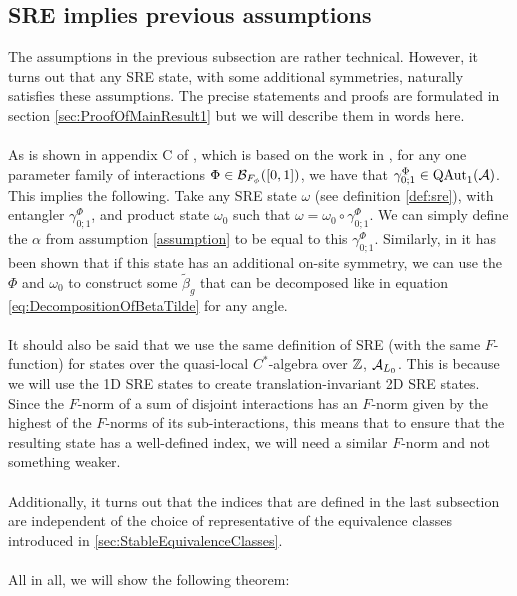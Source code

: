\documentclass[11pt,a4paper,twoside]{article}
\numberwithin{equation}{section}
\begin{document}
	\subsection{SRE implies previous assumptions}\label{sec:Results_1}
	The assumptions in the previous subsection are rather technical. However, it turns out that any SRE state, with some additional symmetries, naturally satisfies these assumptions. The precise statements and proofs are formulated in section \ref{sec:ProofOfMainResult1} but we will describe them in words here.
	\\\\
	As is shown in appendix C of \cite{jappens2023spt}, which is based on the work in \cite{ogata2021h3gmathbb}, for any one parameter family of interactions $\Phi\in\BB_{F_\phi}([0,1])$, we have that $\gamma^\Phi_{0;1}\in\QAut{\AA}$. This implies the following. Take any SRE state $\omega$ (see definition \ref{def:sre}), with entangler $\gamma^\Phi_{0;1}$, and product state $\omega_0$ such that $\omega=\omega_0\circ \gamma^\Phi_{0;1}$. We can simply define the $\alpha$ from assumption \ref{assumption} to be equal to this $\gamma^\Phi_{0;1}$. Similarly, in \cite{ogata2021h3gmathbb} it has been shown that if this state has an additional on-site symmetry, we can use the $\Phi$ and $\omega_0$ to construct some $\tilde\beta_g$ that can be decomposed like in equation \eqref{eq:DecompositionOfBetaTilde} for any angle.
	\\\\
	It should also be said that we use the same definition of SRE (with the same $F$-function) for states over the quasi-local $C^*$-algebra over $\ZZ$, $\AA_{L_0}$. This is because we will use the 1D SRE states to create translation-invariant 2D SRE states. Since the $F$-norm of a sum of disjoint interactions has an $F$-norm given by the highest of the $F$-norms of its sub-interactions, this means that to ensure that the resulting state has a well-defined index, we will need a similar $F$-norm and not something weaker.
	\\\\
	Additionally, it turns out that the indices that are defined in the last subsection are independent of the choice of representative of the equivalence classes introduced in \ref{sec:StableEquivalenceClasses}.
	\\\\
	All in all, we will show the following theorem:
\end{document}

